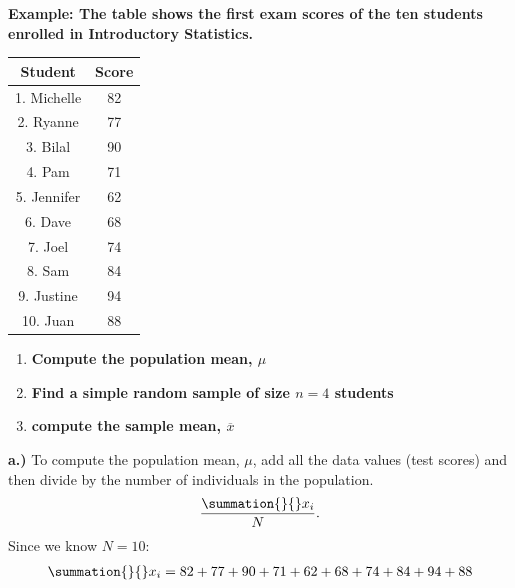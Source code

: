 \documentclass{report}
\begin{document}
        \begin{mdframed}
          \textbf{Example: The table shows the first exam scores of the ten students enrolled in Introductory Statistics. }
          \begin{center}
          \begin{tabular}{|c|c|}
            \hline
            \textbf{Student} & \textbf{Score} \\
            \hline
            1. Michelle & 82 \\
                \hline
            2. Ryanne & 77 \\
                \hline
            3. Bilal & 90 \\
                \hline
            4. Pam & 71 \\
                \hline
            5. Jennifer & 62 \\
                \hline
            6. Dave & 68 \\
                \hline
            7. Joel & 74 \\
                \hline
            8. Sam & 84 \\
                \hline
            9. Justine & 94 \\
                \hline
            10. Juan & 88 \\
            \hline
            \end{tabular}
          \end{center}
          \bigbreak \noindent 
          \begin{enumerate}[label=\alph*.)]
          \item \textbf{Compute the population mean, $\mu $}
          \item \textbf{Find a simple random sample of size $n=4$ students}
          \item \textbf{compute the sample mean, $\overline{x} $}
          \end{enumerate}
          \bigbreak \noindent 
          \textbf{a.)} To compute the population mean, $\mu$,  add all the data values (test scores) and then divide by the number of individuals in the population.
          \begin{align*}
              \frac{\summation{}{}x_{i}}{N}
          .\end{align*}
          \bigbreak \noindent 
          Since we know $N = 10$:
          \begin{align*}
              \summation{}{}x_{i} = 82+77+90+71+62+68+74+84+94+88 \\

\end{align*}
\end{mdframed}
\end{document}
